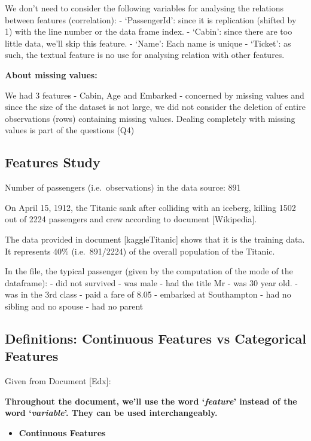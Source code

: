\documentclass[11pt]{article}
\providecommand{\tightlist}{%
      \setlength{\itemsep}{0pt}\setlength{\parskip}{0pt}}
\begin{document}
We don't need to consider the following variables for analysing the
relations between features (correlation): - `PassengerId': since it is
replication (shifted by 1) with the line number or the data frame index.
- `Cabin': since there are too little data, we'll skip this feature. -
`Name': Each name is unique - `Ticket': as such, the textual feature is
no use for analysing relation with other features.

\textbf{About missing values:}

We had 3 features - Cabin, Age and Embarked - concerned by missing
values and since the size of the dataset is not large, we did not
consider the deletion of entire observations (rows) containing missing
values. Dealing completely with missing values is part of the questions
(Q4)

    \subsection{Features Study}\label{features-study}

Number of passengers (i.e.~observations) in the data source: 891

On April 15, 1912, the Titanic sank after colliding with an iceberg,
killing 1502 out of 2224 passengers and crew according to document
{[}Wikipedia{]}.

The data provided in document {[}kaggleTitanic{]} shows that it is the
training data. It represents 40\% (i.e.~891/2224) of the overall
population of the Titanic.

In the file, the typical passenger (given by the computation of the mode
of the dataframe): - did not survived - was male - had the title Mr -
was 30 year old. - was in the 3rd class - paid a fare of 8.05 - embarked
at Southampton - had no sibling and no spouse - had no parent

    \subsection{Definitions: Continuous Features vs Categorical
Features}\label{definitions-continuous-features-vs-categorical-features}

Given from Document {[}Edx{]}:

\textbf{Throughout the document, we'll use the word `\emph{feature}'
instead of the word `\emph{variable}'. They can be used
interchangeably.}

\begin{itemize}
\tightlist
\item
  \textbf{Continuous Features}
\end{itemize}
\end{document}
